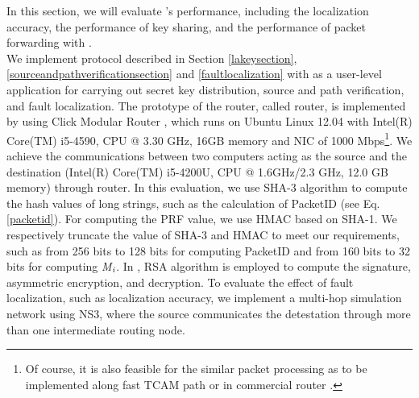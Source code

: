 In this section, we will evaluate \name{}'s performance, including the localization accuracy, the performance of key sharing, and the performance of packet forwarding with \name{}.\\
 We implement \name{} protocol described in Section \ref{lakeysection}, \ref{sourceandpathverificationsection} and \ref{faultlocalization} with \namekey{} as a user-level application for carrying out secret key distribution, source and path verification, and fault localization. The prototype of the router, called \name{} router, is implemented by using Click Modular Router \cite{kohler2000click}, which runs on Ubuntu Linux 12.04 with Intel(R) Core(TM) i5-4590, CPU @ 3.30 GHz, 16GB memory and NIC of 1000 Mbps\footnote{Of course, it is also feasible for the similar packet processing as \name{} to be implemented along fast TCAM path or in commercial router \cite{basescu2016high}.}. We achieve the communications between two computers acting as the source and the destination (Intel(R) Core(TM) i5-4200U, CPU @ 1.6GHz/2.3 GHz, 12.0 GB memory) through \name{} router. In this evaluation, we use SHA-3 algorithm to compute the hash values of long strings, such as the calculation of PacketID (see Eq. \ref{packetid}). For computing the PRF value, we use HMAC based on SHA-1. We respectively truncate the value of SHA-3 and HMAC to meet our requirements, such as from 256 bits to 128 bits for computing PacketID and from 160 bits to 32 bits for computing \emph{M}$_\emph{i}$. In \namekey{}, RSA algorithm is employed to compute the signature, asymmetric encryption, and decryption. To evaluate the effect of fault localization, such as localization accuracy, we implement a multi-hop simulation network using NS3, where the source communicates the detestation through more than one intermediate routing node.
